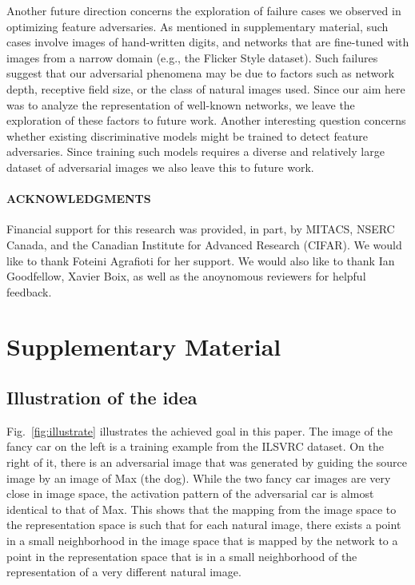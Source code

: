 \documentclass{article} %
\newcommand{\beginsupplement}{%
\renewcommand{\thesection}{}%
\renewcommand{\thesubsection}{S\arabic{subsection}}%
        \setcounter{table}{0}
        \renewcommand{\thetable}{S\arabic{table}}%
        \setcounter{figure}{0}
        \renewcommand{\thefigure}{S\arabic{figure}}%
     }
\begin{document}
Another future direction concerns the exploration of failure cases we
observed in optimizing feature adversaries. As mentioned in supplementary
material, such cases involve images of hand-written digits, and networks
that are fine-tuned with images from a narrow domain (e.g., the Flicker
Style dataset). Such failures suggest that our adversarial phenomena may
be due to factors such as network  depth, receptive field size, or the
class of natural images used.  Since our aim here was to analyze the
representation of well-known networks, we leave the exploration of these
factors to future work.
Another interesting question concerns whether existing discriminative
models might be trained to detect feature adversaries.  Since training
such models requires a diverse and relatively large dataset of adversarial
images we also leave this to future work.


\begin{footnotesize}
\paragraph{ACKNOWLEDGMENTS}  Financial support for this research was
provided, in part, by MITACS, NSERC Canada, and the Canadian Institute
for Advanced Research (CIFAR). We would like to thank Foteini Agrafioti
for her support. We would also like to thank Ian Goodfellow, Xavier Boix,
as well as the anoynomous reviewers for helpful feedback.
\end{footnotesize}


\vfill

\newpage
\beginsupplement\section*{Supplementary Material}\label{}\subsection{Illustration of the idea}
Fig.~\ref{fig:illustrate} illustrates the achieved goal in this paper. The
image of the fancy car on the left is a training example from the ILSVRC
dataset. On the right of it, there is an adversarial image that was generated
by guiding the source image by an image of Max (the dog). While the two fancy
car images are very close in image space, the activation pattern of the
adversarial car is almost identical to that of Max.  This shows that the
mapping from the image space to the representation space is such that for each
natural image, there exists a point in a small neighborhood in the image space
that is mapped by the network to a point in the representation space that is in
a small neighborhood of the representation of a very different natural image.
\end{document}
